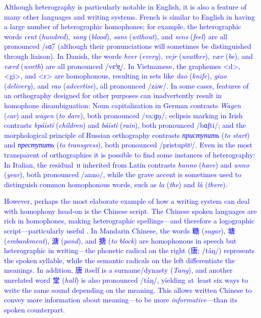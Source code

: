 \documentclass[doc,biblatex]{apa7}
\newcommand\newmaterial[1]{\textcolor{blue}{#1}}
\begin{document}
\newmaterial{Although heterography is particularly notable in English, it is also a feature of many other languages and writing systems. French is similar to English in having a large number of heterographic homophones; for example, the heterographic words \textit{cent} (\textit{hundred}), \textit{sang} (\textit{blood}), \textit{sans} (\textit{without}), and \textit{sens} (\textit{feel}) are all pronounced /sɑ̃/ (although their pronunciations will sometimes be distinguished through liaison). In Danish, the words \textit{hver} (\textit{every}), \textit{vejr} (\textit{weather}), \textit{vær} (\textit{be}), and \textit{værd} (\textit{worth}) are all pronounced /vεˀɐ̯/. In Vietnamese, the graphemes <d>, <gi>, and <r> are homophonous, resulting in sets like \textit{dao} (\textit{knife}), \textit{giao} (\textit{delivery}), and \textit{rao} (\textit{advertise}), all pronounced /zāw/. In some cases, features of an orthography designed for other purposes can inadvertently result in homophone disambiguation: Noun capitalization in German contrasts \textit{Wagen} (\textit{car}) and \textit{wagen} (\textit{to dare}), both pronounced /vaːɡṇ/; eclipsis marking in Irish contrasts \textit{bpáistí} (\textit{children}) and \textit{báistí} (\textit{rain}), both pronounced /bɑʃti/; and the morphological principle of Russian orthography contrasts \textit{приступить} (\textit{to start}) and \textit{преступить} (\textit{to transgress}), both pronounced /pristupʲitʲ/. Even in the most transparent of orthographies it is possible to find some instances of heterography: In Italian, the residual~\textsc{h} inherited from Latin contrasts \textit{hanno} (\textit{have}) and \textit{anno} (\textit{year}), both pronounced /anno/, while the grave accent is sometimes used to distinguish common homophonous words, such as \textit{la} (\textit{the}) and \textit{là} (\textit{there}).}

\newmaterial{However, perhaps the most elaborate example of how a writing system can deal with homophony head-on is the Chinese script. The Chinese spoken languages are rich in homophones, making heterographic spellings---and therefore a logographic script---particularly useful \parencite{Katz:1992}. In Mandarin Chinese, the words 糖 (\textit{sugar}), 塘 (\textit{embankment}), 溏 (\textit{pond}), and 搪 (\textit{to block}) are homophonous in speech but heterographic in writing---the phonetic radical on the right (唐; /táŋ/) represents the spoken syllable, while the semantic radicals on the left differentiate the meanings. In addition, 唐 itself is a surname/dynasty (\textit{Tang}), and another unrelated word 堂 (\textit{hall}) is also pronounced /táŋ/, yielding at~least six ways to write the same sound depending on the meaning. This allows written Chinese to convey more information about meaning---to be more \textit{informative}---than its spoken counterpart.}
\end{document}
